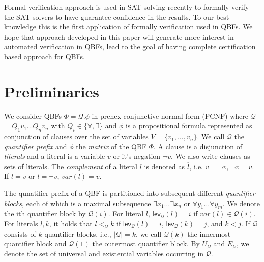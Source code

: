 \documentclass[runningheads]{llncs}
\newcommand{\var}{\mathit{var}}
\newcommand{\matrixf}{\phi}
\newcommand{\qp}{\mathcal{Q}}
\newcommand{\FFF}{\Phi}
\newcommand{\0}{0}
\newcommand{\1}{1}
\def\universals{U_\mathcal{Q}}
\def\existentials{E_\mathcal{Q}}
\def\qlvl{\mathsf{lev_\qp}}
\begin{document}
Formal verification approach is used in SAT solving \cite{BlanchetteFLW18} recently to formally verify the SAT solvers to have guarantee confidence in the results. To our best knowledge this is the first application of formally verification used in QBFs. We hope that approach developed in this paper will generate more interest in automated verification in QBFs, lead to the goal of having complete certification based approach for QBFs. 
 
\section{Preliminaries}
\label{sec:pre}

We consider QBFs $\FFF = {\qp}.\matrixf$ in prenex conjunctive normal form (PCNF) where $\qp$ = $Q_{1} v_{1} \ldots Q_{n} v_{n}$ with $Q_{i} \in \{\forall, \exists \}$ and $\matrixf$ is a propositional formula represented as conjunction of clauses over the set of variables $V = \{v_{1}, \ldots, v_{n}\}$. We call $\qp$ the \textit{quantifier prefix} and $\matrixf$ the \textit{matrix} of the QBF $\Phi$. A clause is a disjunction of \textit{literals} and a literal is a variable $v$ or it's negation $\neg v$. We also write clauses as sets of literals. The \textit{complement} of a literal $l$ is denoted as $\overline{l}$, i.e. $\overline{v} = \neg v$, $\overline{\neg{v}} = v$. If $l = v$ or $l = \neg v$, $\var(l) = v$.

The qunatifier prefix of a QBF is partitioned into subsequent different \textit{quantifier blocks}, each of which is a maximal subsequence $\exists x_{1} \ldots \exists x_{n}$ or $\forall y_{1} \ldots \forall y_{m}$. We denote the ith quantifier block by $\qp(i)$. For literal $l$, $\qlvl(l) = i$ if $\var(l) \in \qp(i)$. For literals $l, k$, it holds that $l <_\qp k$ if $\qlvl(l) = i$, $\qlvl(k) = j$, and $k < j$. If $\qp$ consists of $k$ quantifier blocks, i.e., $|\qp| = k$,  we call $\qp({k})$ the innermost quantifier block and $\qp({1})$ the outermost quantifier block. By $\universals$ and $\existentials$, we denote the set of universal and existential variables occurring in $\qp$. 
\end{document}
